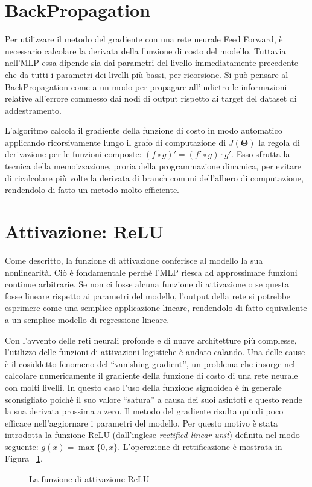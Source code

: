 \section{BackPropagation}
Per utilizzare il metodo del gradiente con una rete neurale Feed Forward, è
necessario calcolare la derivata della funzione di costo del modello. Tuttavia
nell'MLP essa dipende sia dai parametri del livello immediatamente precedente
che da tutti i parametri dei livelli più bassi, per ricorsione. Si può pensare
al BackPropagation come a un modo per propagare all'indietro le informazioni
relative all'errore commesso dai nodi di output rispetto ai target del dataset
di addestramento.

L'algoritmo calcola il gradiente della funzione di costo in modo automatico
applicando ricorsivamente lungo il grafo di computazione di $J(\bm \Theta)$ la
regola di derivazione per le funzioni composte: $ (f \circ g)' = (f' \circ
g)\cdot g' $. Esso sfrutta la tecnica della memoizzazione, proria della
programmazione dinamica, per evitare di ricalcolare più volte la derivata di
branch comuni dell'albero di computazione, rendendolo di fatto un metodo molto
efficiente.
\section{Attivazione: ReLU}
Come descritto, la funzione di attivazione conferisce al modello la sua
nonlinearità. Ciò è fondamentale perchè l'MLP riesca ad approssimare funzioni
continue arbitrarie. Se non ci fosse alcuna funzione di attivazione o se questa
fosse lineare rispetto ai parametri del modello, l'output della rete si
potrebbe esprimere come una semplice applicazione lineare, rendendolo di fatto
equivalente a un semplice modello di regressione lineare.

Con l'avvento delle reti neurali profonde e di nuove architetture più
complesse, l'utilizzo delle funzioni di attivazioni logistiche è andato
calando. Una delle cause è il cosiddetto fenomeno del ``vanishing gradient'',
un problema che insorge nel calcolare numericamente il gradiente della funzione
di costo di una rete neurale con molti livelli. In questo caso l'uso della
funzione sigmoidea è in generale sconsigliato poichè il suo valore ``satura'' a
causa dei suoi asintoti e questo rende la sua derivata prossima a zero. Il
metodo del gradiente risulta quindi poco efficace nell'aggiornare i parametri
del modello.  Per questo motivo è stata introdotta la funzione ReLU
(dall'inglese \emph{rectified linear unit}) definita nel modo seguente: $g(x) =
\max\{0, x\}$. L'operazione di rettificazione è mostrata in Figura~%
\ref{fig:relu}.
\begin{figure}[H]
  \caption{La funzione di attivazione ReLU}%
  \label{fig:relu}
\end{figure}

